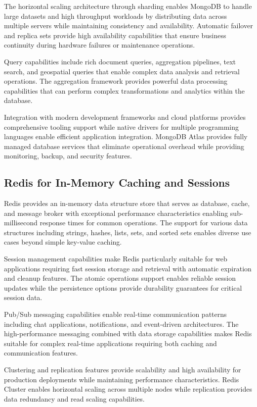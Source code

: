The horizontal scaling architecture through sharding enables MongoDB to handle large datasets and high throughput workloads by distributing data across multiple servers while maintaining consistency and availability. Automatic failover and replica sets provide high availability capabilities that ensure business continuity during hardware failures or maintenance operations.

Query capabilities include rich document queries, aggregation pipelines, text search, and geospatial queries that enable complex data analysis and retrieval operations. The aggregation framework provides powerful data processing capabilities that can perform complex transformations and analytics within the database.

Integration with modern development frameworks and cloud platforms provides comprehensive tooling support while native drivers for multiple programming languages enable efficient application integration. MongoDB Atlas provides fully managed database services that eliminate operational overhead while providing monitoring, backup, and security features.

\subsection{Redis for In-Memory Caching and Sessions}

Redis provides an in-memory data structure store that serves as database, cache, and message broker with exceptional performance characteristics enabling sub-millisecond response times for common operations. The support for various data structures including strings, hashes, lists, sets, and sorted sets enables diverse use cases beyond simple key-value caching.

Session management capabilities make Redis particularly suitable for web applications requiring fast session storage and retrieval with automatic expiration and cleanup features. The atomic operations support enables reliable session updates while the persistence options provide durability guarantees for critical session data.

Pub/Sub messaging capabilities enable real-time communication patterns including chat applications, notifications, and event-driven architectures. The high-performance messaging combined with data storage capabilities makes Redis suitable for complex real-time applications requiring both caching and communication features.

Clustering and replication features provide scalability and high availability for production deployments while maintaining performance characteristics. Redis Cluster enables horizontal scaling across multiple nodes while replication provides data redundancy and read scaling capabilities.


